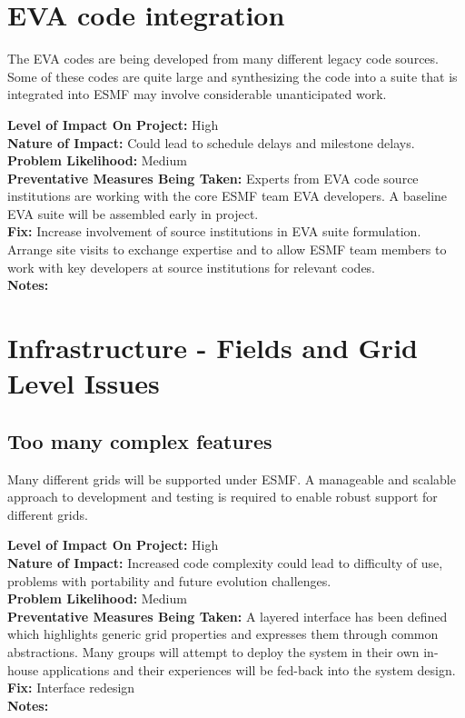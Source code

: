 \documentclass[english]{article}
\newcommand{\req}[1]{\section{\hspace{.2in}#1}}
\newcommand{\sreq}[1]{\subsection{\hspace{.2in}#1}}
\newenvironment
{reqlist}
{\begin{list} {} {} \rm \item[]}
{\end{list}}
\begin{document}
\req{EVA code integration}
The EVA codes are being developed from many different legacy code sources.
Some of these codes are quite large and synthesizing the code into
a suite that is integrated into ESMF may involve considerable unanticipated work.
\begin{reqlist}
{\bf Level of Impact On Project:} High \\
{\bf Nature of Impact:} Could lead to schedule delays and milestone delays.\\
{\bf Problem Likelihood:} Medium \\
{\bf Preventative Measures Being Taken:} Experts from EVA code source institutions
are working with the core ESMF team EVA developers. A baseline EVA suite will
be assembled early in project.\\
{\bf Fix:} Increase involvement of source institutions in EVA suite
formulation. Arrange site visits to exchange expertise and to allow ESMF
team members to work with key developers at source institutions for relevant
codes. \\
{\bf Notes:} 
\end{reqlist}

\req{Infrastructure - Fields and Grid Level Issues}
\sreq{Too many complex features}
Many different grids will be supported under ESMF. A manageable and scalable approach
to development and testing is required to enable robust support for different grids.
\begin{reqlist}
{\bf Level of Impact On Project:} High \\
{\bf Nature of Impact:} Increased code complexity could lead to
difficulty of use, problems with portability and future evolution challenges.\\
{\bf Problem Likelihood:} Medium \\
{\bf Preventative Measures Being Taken:} A layered interface has been defined 
which highlights generic grid properties and expresses them through common abstractions.
Many groups will attempt to deploy the system in their own in-house
applications and their experiences will be fed-back into the system design.\\
{\bf Fix:} Interface redesign \\
{\bf Notes:} 
\end{reqlist}
\end{document}
